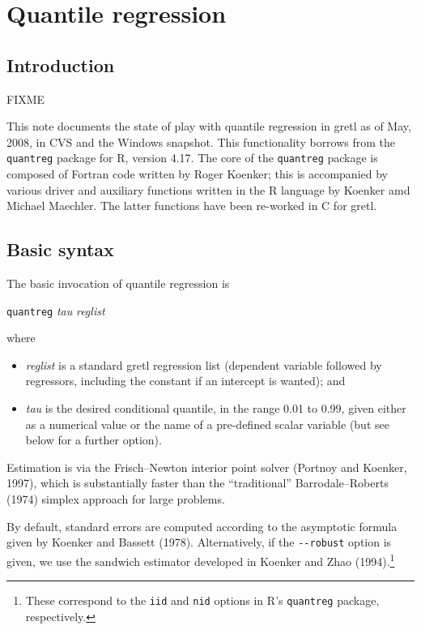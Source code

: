 \chapter{Quantile regression}
\label{chap:quantreg}

\section{Introduction}
\label{sec:rq-intro}

FIXME

This note documents the state of play with quantile regression in
\textsf{gretl} as of May, 2008, in CVS and the Windows snapshot.  This
functionality borrows from the \texttt{quantreg} package for
\textsf{R}, version 4.17.  The core of the \texttt{quantreg} package
is composed of Fortran code written by Roger Koenker; this is
accompanied by various driver and auxiliary functions written in the
\textsf{R} language by Koenker amd Michael Maechler.  The latter
functions have been re-worked in C for \textsf{gretl}.

\section{Basic syntax}

The basic invocation of quantile regression is

\vspace{1em}
\noindent
\qquad \texttt{quantreg} \textsl{tau} \textsl{reglist}
\vspace{1em}

where

\begin{itemize}
\item \textsl{reglist} is a standard \textsf{gretl} regression list
  (dependent variable followed by regressors, including the constant
  if an intercept is wanted); and
\item \textsl{tau} is the desired conditional quantile, in the range
  0.01 to 0.99, given either as a numerical value or the name of a
  pre-defined scalar variable (but see below for a further option).
\end{itemize}

Estimation is via the Frisch--Newton interior point solver (Portnoy
and Koenker, 1997), which is substantially faster than the
``traditional'' Barrodale--Roberts (1974) simplex approach for large
problems.

By default, standard errors are computed according to the asymptotic
formula given by Koenker and Bassett (1978).  Alternatively, if the
\verb|--robust| option is given, we use the sandwich estimator
developed in Koenker and Zhao (1994).\footnote{These correspond to the
  \texttt{iid} and \texttt{nid} options in \textsf{R}'s
  \texttt{quantreg} package, respectively.}

